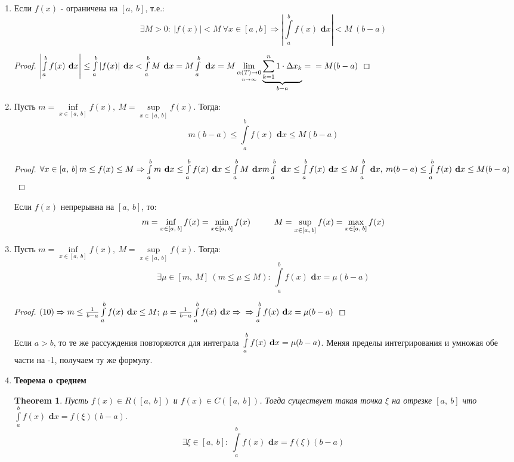 \documentclass[a4paper,12pt, centered]{bookest}
\newtheorem{theorem}{Theorem}[section]
\theoremstyle{remark}
\newtheorem*{remark}{Remark}
\newcommand\tab[1][1cm]{\hspace*{#1}}
\newcommand\dx{\textbf{ d}x}
\begin{document}
\begin{enumerate}
\begin{proof}
	\end{proof}
	\begin{remark}
		Если $a>b;$ $$\left|\int\limits_{a}^{b}f(x)\dx\right|\leq\left|\int\limits_{a}^{b}|f(x)|\dx\right|$$
	\end{remark}
	\item Если $f(x)$ - ограничена на $[a,\>b]$, т.е.: $$\exists M>0:\>|f(x)|<M\>\forall x\in [a\>,b]\Rightarrow\left|\int\limits_a^bf(x)\dx\right|<M\>(b-a)$$
	\begin{proof}
	$\left|\int\limits_a^bf(x)\dx\right|\leq\int\limits_a^b|f(x)|\dx<\int\limits_a^bM\dx=M\int\limits_a^b\dx=M\lim\limits_{\underset{n\to\infty}{\alpha(T)\to0}}\underbrace{\sum\limits_{k=1}^n1\cdot\Delta x_k}_{b-a}=\\=M(b-a)$
	\end{proof}
	\item Пусть $m=\inf\limits_{x\in[a,\>b]}f(x),\>M=\sup\limits_{x\in[a,\>b]}f(x).$ Тогда:$$m(b-a)\leq\int\limits_{a}^{b}f(x)\dx\leq M(b-a)$$ \begin{proof}
		$\forall x\in[a,\>b]\>m\leq f(x)\leq M\Rightarrow\int\limits_{a}^{b}m\dx\leq \int\limits_{a}^{b}f(x)\dx\leq \int\limits_{a}^{b}M\dx\\m\int\limits_{a}^{b}\dx\leq\int\limits_{a}^{b}f(x)\dx\leq M\int\limits_{a}^{b}\dx,\>m(b-a)\leq \int\limits_{a}^{b}f(x)\dx\leq M(b-a)$
	\end{proof} 
	Если $f(x)$ непрерывна на $[a,\>b]$, то: $$m=\inf\limits_{x\in[a,\>b]}f(x)=\min\limits_{x\in[a,\>b]}f(x)\tab M=\sup\limits_{x\in[a,\>b]}f(x)=\max\limits_{x\in[a,\>b]}f(x)$$
	\item Пусть $m=\inf\limits_{x\in[a,\>b]}f(x),\>M=\sup\limits_{x\in[a,\>b]}f(x).$ Тогда: $$\exists\mu\in[m,\>M]\>(m\leq\mu\leq M):\>\int\limits_{a}^{b}f(x)\dx=\mu(b-a)$$ \begin{proof}
		$(10)\Rightarrow m\leq\frac1{b-a}\int\limits_{a}^{b}f(x)\dx\leq M;\>\mu=\frac1{b-a}\int\limits_{a}^{b}f(x)\dx\Rightarrow\\\Rightarrow\int\limits_{a}^{b}f(x)\dx=\mu(b-a)$
	\end{proof}
	Если $a>b$, то те же рассуждения повторяются для интеграла $\\\int\limits_{a}^{b}f(x)\dx=\mu(b-a)$. Меняя пределы интегрирования и умножая обе части на -1, получаем ту же формулу.
	\newpage
	\item \textbf{Теорема о среднем} \begin{theorem}
		Пусть $f(x)\in R([a,\>b])$ и $f(x)\in C([a,\>b])$. Тогда существует такая точка $\xi$ на отрезке $[a,\>b]$ что $\int\limits_{a}^{b}f(x)\dx=f(\xi)(b-a).$ $$\exists\xi\in[a,\>b]:\>\int\limits_{a}^{b}f(x)\dx=f(\xi)(b-a)$$

\end{theorem}
\end{enumerate}
\end{document}
